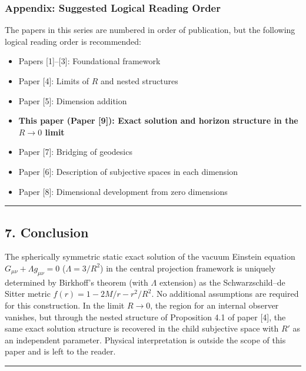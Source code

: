 \documentclass[a4paper,11pt]{article}
\theoremstyle{definition}
\providecommand{\tightlist}{\setlength{\itemsep}{0pt}\setlength{\parskip}{0pt}}
\begin{document}
\subsubsection{Appendix: Suggested Logical Reading
Order}\label{appendix-suggested-logical-reading-order}

The papers in this series are numbered in order of publication, but the
following logical reading order is recommended:

\begin{itemize}
\tightlist
\item
  Papers {[}1{]}--{[}3{]}: Foundational framework
\item
  Paper {[}4{]}: Limits of \(R\) and nested structures
\item
  Paper {[}5{]}: Dimension addition
\item
  \textbf{This paper (Paper {[}9{]}): Exact solution and horizon
  structure in the \(R \to 0\) limit}
\item
  Paper {[}7{]}: Bridging of geodesics
\item
  Paper {[}6{]}: Description of subjective spaces in each dimension
\item
  Paper {[}8{]}: Dimensional development from zero dimensions
\end{itemize}

\begin{center}\rule{0.5\linewidth}{0.5pt}\end{center}

\subsection{7. Conclusion}\label{conclusion}

The spherically symmetric static exact solution of the vacuum Einstein
equation \(G_{\mu\nu} + \Lambda g_{\mu\nu} = 0\) (\(\Lambda = 3/R^2\))
in the central projection framework is uniquely determined by Birkhoff's
theorem (with \(\Lambda\) extension) as the Schwarzschild--de Sitter
metric \(f(r) = 1 - 2M/r - r^2/R^2\). No additional assumptions are
required for this construction. In the limit \(R \to 0\), the region for
an internal observer vanishes, but through the nested structure of
Proposition 4.1 of paper {[}4{]}, the same exact solution structure is
recovered in the child subjective space with \(R'\) as an independent
parameter. Physical interpretation is outside the scope of this paper
and is left to the reader.

\begin{center}\rule{0.5\linewidth}{0.5pt}\end{center}
\end{document}
